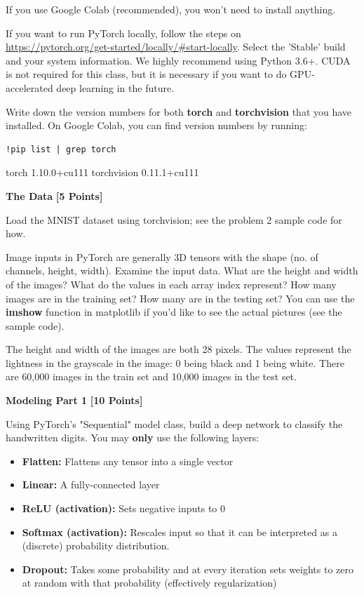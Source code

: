 If you use Google Colab (recommended), you won't need to install anything.

If you want to run PyTorch locally, follow the steps on \\
\url{https://pytorch.org/get-started/locally/#start-locally}. Select the 'Stable' build and your system information. We highly recommend using Python 3.6+. CUDA is not required for this class, but it is necessary if you want to do GPU-accelerated deep learning in the future.

Write down the version numbers for both \textbf{torch} and \textbf{torchvision} that you have installed. On Google Colab, you can find version numbers by running: \begin{verbatim}!pip list | grep torch\end{verbatim}

\begin{solution}
  torch                         1.10.0+cu111 \newline
  torchvision                   0.11.1+cu111 
\end{solution}


\problem \textbf{The Data} \textbf{[5 Points]}

Load the MNIST dataset using torchvision; see the problem 2 sample code for how.

Image inputs in PyTorch are generally 3D tensors with the shape (no. of channels, height, width). Examine the input data. What are the height and width of the images? What do the values in each array index represent?  How many images are in the training set? How many are in the testing set? You can use the \textbf{imshow} function in matplotlib if you'd like to see the actual pictures (see the sample code).

\begin{subsolution}
  The height and width of the images are both 28 pixels. The values represent the lightness in the grayscale in the image: 0 being black and 1 being white. There are 60,000 images in the train set and 10,000 images in the test set.
\end{subsolution}

 \problem \textbf{Modeling Part 1} \textbf{[10 Points]}

 Using PyTorch's "Sequential" model class, build a deep network to classify the handwritten digits. You may \textbf{only} use the following layers:

 \begin{itemize}
  \item \textbf{Flatten:} Flattens any tensor into a single vector
  \item \textbf{Linear:} A fully-connected layer
  \item \textbf{ReLU (activation):} Sets negative inputs to 0
  \item \textbf{Softmax (activation):} Rescales input so that it can be interpreted as a (discrete) probability distribution.
  \item \textbf{Dropout:} Takes some probability and at every iteration sets weights to zero at random with that probability (effectively regularization)
\end{itemize}

